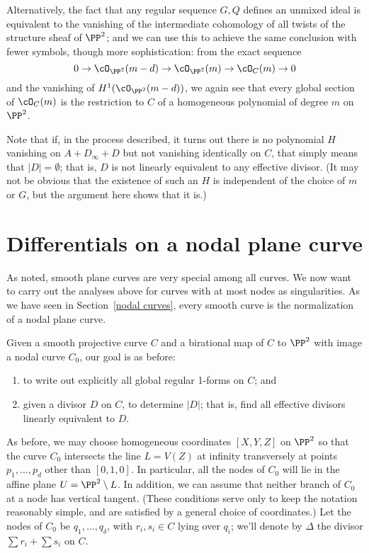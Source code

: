 Alternatively, the fact that any regular sequence $G,Q$ defines an unmixed ideal is equivalent to the vanishing of the intermediate cohomology of all twists of the structure sheaf of $\PP^2$; and we can use this to achieve the same conclusion with fewer symbols, though more sophistication: from the exact sequence 
$$
0 \to \cO_{\PP^2}(m-d) \to \cO_{\PP^2}(m)  \to \cO_C(m) \to 0
$$
and the vanishing of $H^1(\cO_{\PP^2}(m-d))$, we again see that every global section of $ \cO_C(m)$ is the restriction to $C$ of a homogeneous polynomial of degree $m$ on $\PP^2$. 

Note that if, in the process described, it turns out there is no polynomial $H$ vanishing on  $A + D_\infty + D$ but not vanishing identically on $C$, that simply means that $|D| = \emptyset$; that is, $D$ is not linearly equivalent to any effective divisor. (It may not be obvious that the existence of such an $H$ is independent of the choice of $m$ or $G$, but the argument here shows that it is.)



\section{Differentials on a nodal plane curve}\label{canonical series on nodal plane curves}

As noted, smooth plane curves are very special among all curves. We now want to carry out the analyses above for curves with at most nodes as singularities. As we have seen in Section~\ref{nodal curves}, every smooth curve is the normalization of a nodal plane curve.


Given a smooth projective curve $C$ and a birational map of $C$ to $\PP^2$ with image a nodal curve $C_0$, our goal is as before:
\begin{enumerate}
\item to write out explicitly all global regular 1-forms on $C$; and
\item given a divisor $D$ on $C$, to  determine $|D|$; that is, find all effective divisors linearly equivalent to $D$.
\end{enumerate}

As before, we may choose homogeneous coordinates  $[X,Y,Z]$ on $\PP^2$ so that the curve $C_0$ intersects the line $L = V(Z)$ at infinity transversely at points $p_1,\dots,p_d$ other than $[0,1,0]$. In particular,  all the nodes of $C_0$ will lie in the affine plane $U = \PP^2 \setminus L$.
In addition, we can assume that  neither branch of $C_0$ at a node has vertical tangent. (These conditions serve only to keep the notation reasonably simple, and are satisfied by a general choice of coordinates.) Let the nodes of $C_0$ be $q_1,\dots,q_\delta$, with $r_i, s_i \in C$ lying over $q_i$; we'll denote by $\Delta$ the divisor $\sum r_i + \sum s_i$ on $C$.

